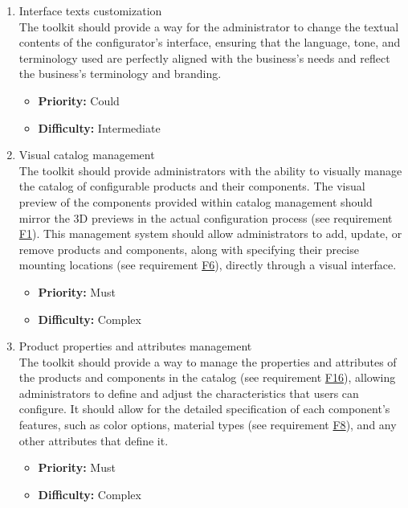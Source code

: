 \begin{enumerate}[label=\textbf{F\arabic*:}, leftmargin=30pt]
\item \label{itm:F15} Interface texts customization
\vspace{2pt}
\\The toolkit should provide a way for the administrator to change the textual contents of the configurator's interface, ensuring that the language, tone, and terminology used are perfectly aligned with the business's needs \phantom{and reflect the business's terminology and branding.}\newpage and reflect the business's terminology and branding.
\begin{itemize}[noitemsep, label=\trianglebullet]
    \item \textbf{Priority:} Could
    \item \textbf{Difficulty:} Intermediate
\end{itemize}
\vspace{4pt}

\item \label{itm:F16} Visual catalog management
\vspace{2pt}
\\The toolkit should provide administrators with the ability to visually manage the catalog of configurable products and their components. The visual preview of the components provided within catalog management should mirror the 3D previews in the actual configuration process (see requirement \hyperref[itm:F1]{F1}). This management system should allow administrators to add, update, or remove products and components, along with specifying their precise mounting locations (see requirement \hyperref[itm:F6]{F6}), directly through a visual interface.
\begin{itemize}[noitemsep, label=\trianglebullet]
    \item \textbf{Priority:} Must
    \item \textbf{Difficulty:} Complex
\end{itemize}
\vspace{4pt}

\item \label{itm:F17} Product properties and attributes management
\vspace{2pt}
\\The toolkit should provide a way to manage the properties and attributes of the products and components in the catalog (see requirement \hyperref[itm:F16]{F16}), allowing administrators to define and adjust the characteristics that users can configure. It should allow for the detailed specification of each component's features, such as color options, material types (see requirement \hyperref[itm:F8]{F8}), and any other attributes that define it.
\begin{itemize}[noitemsep, label=\trianglebullet]
    \item \textbf{Priority:} Must
    \item \textbf{Difficulty:} Complex
\end{itemize}
\vspace{4pt}



\end{enumerate}
